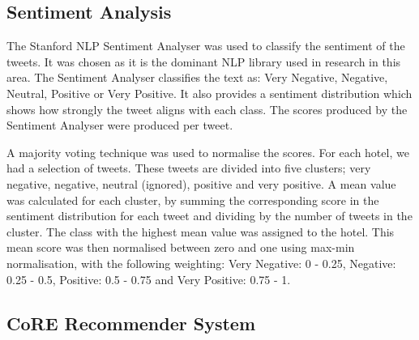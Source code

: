 \subsection{Sentiment Analysis}

The Stanford NLP Sentiment Analyser \cite{stanfordSentiment2013} was used to classify the sentiment of the tweets. It was chosen as it is the dominant NLP library used in research in this area. The Sentiment Analyser classifies the text as: Very Negative, Negative, Neutral, Positive or Very Positive. It also provides a sentiment distribution which shows how strongly the tweet aligns with each class. The scores produced by the Sentiment Analyser were produced per tweet.

A majority voting technique was used to normalise the scores. For each hotel, we had a selection of tweets. These tweets are divided into five clusters; very negative, negative, neutral (ignored), positive and very positive. A mean value was calculated for each cluster, by summing the corresponding score in the sentiment distribution for each tweet and dividing by the number of tweets in the cluster. The class with the highest mean value was assigned to the hotel. This mean score was then normalised between zero and one using max-min normalisation, with the following weighting: Very Negative: 0 - 0.25, Negative: 0.25 - 0.5, Positive: 0.5 - 0.75 and Very Positive: 0.75 - 1.



\subsection{CoRE Recommender System}

